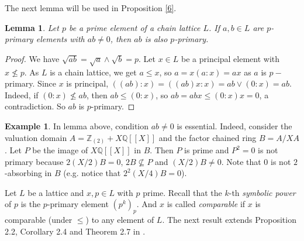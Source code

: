 \documentclass{amsart}
\theoremstyle{plain}
\newtheorem{lemma}[theorem]{Lemma}
\theoremstyle{definition}
\newtheorem{example}[theorem]{Example}
\theoremstyle{remark}
\begin{document}
The next lemma will be used in Proposition \ref{6}.
 

\begin{lemma}\label{20}
Let $p$ be a prime element of a chain lattice $L$. If $a,b\in L$ are $p$-primary elements with $ab\neq 0$, then  $ab$ is also  $p$-primary.
\end{lemma}
\begin{proof}
We have $\sqrt{ab} = \sqrt{a}\wedge \sqrt{b} = p$.
Let $x\in L$ be a principal element with $x \not\leq  p$. As   $L$ is a chain lattice, we get  $a \leq x$, so $a=x(a:x)=ax$  as $a$ is $p-$primary. 
Since $x$ is principal,  $((ab):x) = ((ab)x:x) = ab \vee (0:x) = ab$.  
Indeed, if $(0:x)\not\leq ab$, then  $ab \leq (0:x)$, so $ab=abx \leq (0:x)x=0$, a contradiction. So $ab$ is $p$-primary.
\end{proof}

\begin{example}\label{11}
In lemma above, condition $ab\neq 0$ is essential. 
Indeed, consider the valuation domain  $A=\mathbb{Z}_{(2)}+X\mathbb{Q}[[X]]$ and the factor chained ring $B=A/XA$. Let $P$ be the image of $X\mathbb{Q}[[X]]$ in $B$. Then $P$ is prime and $P^2=0$ is not primary because 
$2(X/2)B=0$, $2B\not\subseteq  P$ and $(X/2)B\neq 0$. Note that $0$ is not $2$-absorbing in $B$ (e.g. notice that $2^2(X/4)B=0$).
\end{example}

Let $L$ be a lattice and $x,p\in L$ with $p$ prime.
Recall  that the $k$-th {\em symbolic power} of $p$   is 
 the $p$-primary element $(p^k)_p$. And   $x$  is called  {\em comparable} if $x$ is comparable (under $\leq$) to any element of $L$.
The next result extends  
Proposition 2.2, Corollary 2.4 and Theorem 2.7 in \cite{ADK}. 
\end{document}
